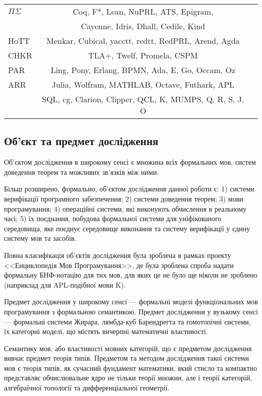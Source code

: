 \begin{table}[ht]
\begin{tabular}{lcc}
    \hline
       $\Pi\Sigma$ & Coq, F*, Lean, NuPRL, ATS, Epigram, \\
          & Cayenne, Idris, Dhall, Cedile, Kind \\
    \hline
       HoTT & Menkar, Cubical, yacctt, redtt, RedPRL, Arend, Agda \\
    \hline
       CHKR & TLA+, Twelf, Promela, CSPM \\
    \hline
       PAR & Ling, Pony, Erlang, BPMN, Ada, E, Go, Occam, Oz \\
    \hline
       ARR & Julia, Wolfram, MATHLAB, Octave, Futhark, APL \\
           & SQL, cg, Clarion, Clipper, QCL, K, MUMPS, Q, R, S, J, O \\
    \hline
  \end{tabular}
\end{table}

\subsection{Об'єкт та предмет дослідження}
Об'єктом дослідження в широкому сенсі є множина
всіх формальних мов, систем доведення теорем та можливих зв'язків між ними.

Більш розширено, формально, об'єктом дослідження данної роботи є:
1) системи верифікації програмного забезпечення;
2) системи доведення теорем;
3) мови програмування;
4) операційні системи, які виконують обчислення в реальному часі;
5) їх поєднання, побудова формальної системи для
уніфікованого середовища, яке поєднує середовище
виконання та систему верифікації у єдину систему мов та засобів.

Повна класифікація об'єктів дослідження була зроблена в рамках проекту
<<Енциклопедія Мов Програмування>>, де була зроблена спроба надати
формальну БНФ-нотацію для тих мов, для яких це не було ще ніколи
не зроблено (наприклад для APL-подібної мови K).

Предмет дослідження у широкому сенсі --- формальні моделі функціональних
мов програмування з формальною семантикою. Предмет дослідження у
вузькому сенсі --- формальні системи Жирара, лямбда-куб Барендрегта
та гомотопічні системи, їх категорні моделі, що містять вичерпні
математичні властивості.

Семантику мов, або властивості мовних категорій, що є предметом
дослідження вивчає предмет теорія типів. Предметом та методом
дослідження такої системи мов є теорія типів, як сучасний фундамент
математики, який стисло та компактно представляє обчислювальне ядро
не тільки теорії множин, але і теорії категорій, алгебраїчної
топології та дифференціальної геометрії.

